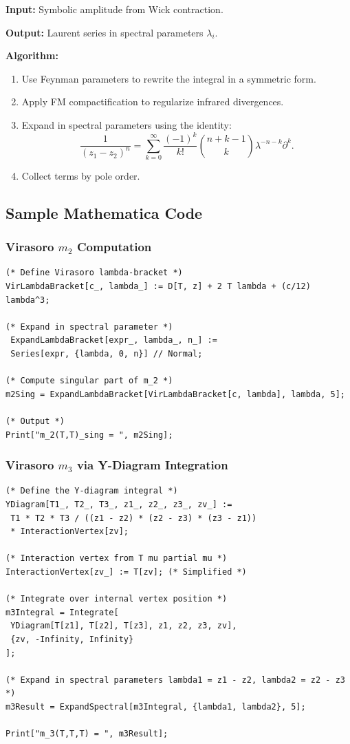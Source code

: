 \textbf{Input:} Symbolic amplitude from Wick contraction.

\textbf{Output:} Laurent series in spectral parameters $\lambda_i$.

\textbf{Algorithm:}
\begin{enumerate}
\item Use Feynman parameters to rewrite the integral in a symmetric form.
\item Apply FM compactification to regularize infrared divergences.
\item Expand in spectral parameters using the identity:
\[
\frac{1}{(z_1-z_2)^n} = \sum_{k=0}^\infty \frac{(-1)^k}{k!} \binom{n+k-1}{k} \lambda^{-n-k} \partial^k.
\]
\item Collect terms by pole order.
\end{enumerate}

\subsection{Sample Mathematica Code}

\subsubsection{Virasoro $m_2$ Computation}

\begin{verbatim}
(* Define Virasoro lambda-bracket *)
VirLambdaBracket[c_, lambda_] := D[T, z] + 2 T lambda + (c/12) lambda^3;

(* Expand in spectral parameter *)
 ExpandLambdaBracket[expr_, lambda_, n_] :=
 Series[expr, {lambda, 0, n}] // Normal;

(* Compute singular part of m_2 *)
m2Sing = ExpandLambdaBracket[VirLambdaBracket[c, lambda], lambda, 5];

(* Output *)
Print["m_2(T,T)_sing = ", m2Sing];
\end{verbatim}

\subsubsection{Virasoro $m_3$ via Y-Diagram Integration}

\begin{verbatim}
(* Define the Y-diagram integral *)
YDiagram[T1_, T2_, T3_, z1_, z2_, z3_, zv_] :=
 T1 * T2 * T3 / ((z1 - z2) * (z2 - z3) * (z3 - z1))
 * InteractionVertex[zv];

(* Interaction vertex from T mu partial mu *)
InteractionVertex[zv_] := T[zv]; (* Simplified *)

(* Integrate over internal vertex position *)
m3Integral = Integrate[
 YDiagram[T[z1], T[z2], T[z3], z1, z2, z3, zv],
 {zv, -Infinity, Infinity}
];

(* Expand in spectral parameters lambda1 = z1 - z2, lambda2 = z2 - z3 *)
m3Result = ExpandSpectral[m3Integral, {lambda1, lambda2}, 5];

Print["m_3(T,T,T) = ", m3Result];
\end{verbatim}

